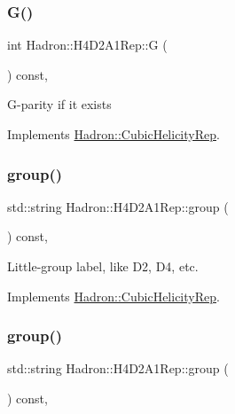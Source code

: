 \subsubsection{\texorpdfstring{G()}{G()}\hspace{0.1cm}{\footnotesize\ttfamily [3/3]}}
{\footnotesize\ttfamily int Hadron\+::\+H4\+D2\+A1\+Rep\+::G (\begin{DoxyParamCaption}{ }\end{DoxyParamCaption}) const\hspace{0.3cm}{\ttfamily [inline]}, {\ttfamily [virtual]}}

G-\/parity if it exists 

Implements \mbox{\hyperlink{structHadron_1_1CubicHelicityRep_a50689f42be1e6170aa8cf6ad0597018b}{Hadron\+::\+Cubic\+Helicity\+Rep}}.

\mbox{\label{structHadron_1_1H4D2A1Rep_a08935df457743813b4a774db746d4b54}} 
\subsubsection{\texorpdfstring{group()}{group()}\hspace{0.1cm}{\footnotesize\ttfamily [1/5]}}
{\footnotesize\ttfamily std\+::string Hadron\+::\+H4\+D2\+A1\+Rep\+::group (\begin{DoxyParamCaption}{ }\end{DoxyParamCaption}) const\hspace{0.3cm}{\ttfamily [inline]}, {\ttfamily [virtual]}}

Little-\/group label, like D2, D4, etc. 

Implements \mbox{\hyperlink{structHadron_1_1CubicHelicityRep_a101a7d76cd8ccdad0f272db44b766113}{Hadron\+::\+Cubic\+Helicity\+Rep}}.

\mbox{\label{structHadron_1_1H4D2A1Rep_a08935df457743813b4a774db746d4b54}} 
\subsubsection{\texorpdfstring{group()}{group()}\hspace{0.1cm}{\footnotesize\ttfamily [2/5]}}
{\footnotesize\ttfamily std\+::string Hadron\+::\+H4\+D2\+A1\+Rep\+::group (\begin{DoxyParamCaption}{ }\end{DoxyParamCaption}) const\hspace{0.3cm}{\ttfamily [inline]}, {\ttfamily [virtual]}}

